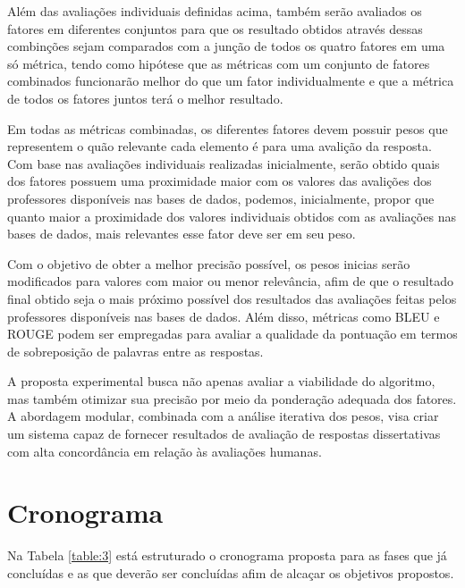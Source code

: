 Além das avaliações individuais definidas acima, também serão avaliados os fatores em diferentes conjuntos para que os resultado obtidos através dessas combinções sejam comparados com a junção de todos os quatro fatores em uma só métrica, tendo como hipótese que as métricas com um conjunto de fatores combinados funcionarão melhor do que um fator individualmente e que a métrica de todos os fatores juntos terá o melhor resultado. 

Em todas as métricas combinadas, os diferentes fatores devem possuir pesos que representem o quão relevante cada elemento é para uma avalição da resposta. Com base nas avaliações individuais realizadas inicialmente, serão obtido quais dos fatores possuem uma proximidade maior com os valores das avalições dos professores disponíveis nas bases de dados, podemos, inicialmente, propor que quanto maior a proximidade dos valores individuais obtidos com as avaliações nas bases de dados, mais relevantes esse fator deve ser em seu peso. 

Com o objetivo de obter a melhor precisão possível, os pesos inicias serão modificados para valores com maior ou menor relevância, afim de que o resultado final obtido seja o mais próximo possível dos resultados das avaliações feitas pelos professores disponíveis nas bases de dados. Além disso, métricas como BLEU e ROUGE podem ser empregadas para avaliar a qualidade da pontuação em termos de sobreposição de palavras entre as respostas.

A proposta experimental busca não apenas avaliar a viabilidade do algoritmo, mas também otimizar sua precisão por meio da ponderação adequada dos fatores. A abordagem modular, combinada com a análise iterativa dos pesos, visa criar um sistema capaz de fornecer resultados de avaliação de respostas dissertativas com alta concordância em relação às avaliações humanas.

\section{Cronograma}
Na Tabela \ref{table:3} está estruturado o cronograma proposta para as fases que já concluídas e as que deverão ser concluídas afim de alcaçar os objetivos propostos.

